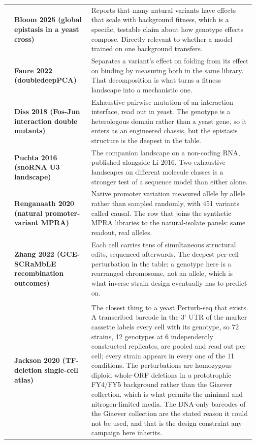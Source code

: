 \begin{longtable}{@{}r@{\hspace{4pt}} L{46mm} L{112mm}@{}}
 & \textbf{Bloom 2025 (global epistasis in a yeast cross)} & Reports that many natural variants have effects that scale with background fitness, which is a specific, testable claim about how genotype effects compose. Directly relevant to whether a model trained on one background transfers. \\
 & \textbf{Faure 2022 (doubledeepPCA)} & Separates a variant's effect on folding from its effect on binding by measuring both in the same library. That decomposition is what turns a fitness landscape into a mechanistic one. \\
 & \textbf{Diss 2018 (Fos-Jun interaction double mutants)} & Exhaustive pairwise mutation of an interaction interface, read out in yeast. The genotype is a heterologous domain rather than a yeast gene, so it enters as an engineered chassis, but the epistasis structure is the deepest in the table. \\
 & \textbf{Puchta 2016 (snoRNA U3 landscape)} & The companion landscape on a non-coding RNA, published alongside Li 2016. Two exhaustive landscapes on different molecule classes is a stronger test of a sequence model than either alone. \\
 & \textbf{Renganaath 2020 (natural promoter-variant MPRA)} & Native promoter variation measured allele by allele rather than sampled randomly, with 451 variants called causal. The row that joins the synthetic MPRA libraries to the natural-isolate panels: same readout, real alleles. \\
 & \textbf{Zhang 2022 (GCE-SCRaMbLE recombination outcomes)} & Each cell carries tens of simultaneous structural edits, sequenced afterwards. The deepest per-cell perturbation in the table: a genotype here is a rearranged chromosome, not an allele, which is what inverse strain design eventually has to predict on. \\
\addlinespace[5pt]
\addlinespace[4pt]
\\
 & \textbf{Jackson 2020 (TF-deletion single-cell atlas)} & The closest thing to a yeast Perturb-seq that exists. A transcribed barcode in the 3' UTR of the marker cassette labels every cell with its genotype, so 72 strains, 12 genotypes at 6 independently constructed replicates, are pooled and read out per cell; every strain appears in every one of the 11 conditions. The perturbations are homozygous diploid whole-ORF deletions in a prototrophic FY4/FY5 background rather than the Giaever collection, which is what permits the minimal and nitrogen-limited media. The DNA-only barcodes of the Giaever collection are the stated reason it could not be used, and that is the design constraint any campaign here inherits. \\

\end{longtable}

